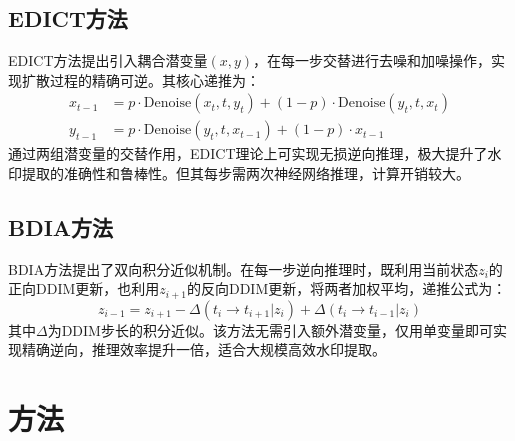 \documentclass[conference]{IEEEtran}
\begin{document}
\subsection{EDICT方法}
EDICT方法\cite{panthi2025watermarkingdiffusionmodelgaussian}提出引入耦合潜变量$(x, y)$，在每一步交替进行去噪和加噪操作，实现扩散过程的精确可逆。其核心递推为：
\begin{align}
    x_{t-1} &= p \cdot \text{Denoise}(x_t, t, y_t) + (1-p) \cdot \text{Denoise}(y_t, t, x_t) \\
    y_{t-1} &= p \cdot \text{Denoise}(y_t, t, x_{t-1}) + (1-p) \cdot x_{t-1}
\end{align}
通过两组潜变量的交替作用，EDICT理论上可实现无损逆向推理，极大提升了水印提取的准确性和鲁棒性。但其每步需两次神经网络推理，计算开销较大。

\subsection{BDIA方法}
BDIA方法\cite{zhang2024exact}提出了双向积分近似机制。在每一步逆向推理时，既利用当前状态$z_i$的正向DDIM更新，也利用$z_{i+1}$的反向DDIM更新，将两者加权平均，递推公式为：
\begin{equation}
    z_{i-1} = z_{i+1} - \Delta(t_i \to t_{i+1}|z_i) + \Delta(t_i \to t_{i-1}|z_i)
\end{equation}
其中$\Delta$为DDIM步长的积分近似。该方法无需引入额外潜变量，仅用单变量即可实现精确逆向，推理效率提升一倍，适合大规模高效水印提取。

\section{方法}
\end{document}
